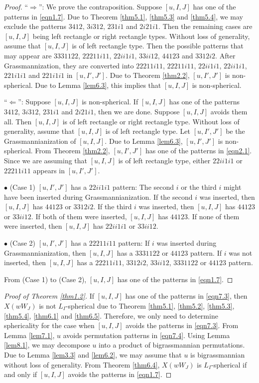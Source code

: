 \documentclass[12pt]{amsart}
\theoremstyle{definition}
\theoremstyle{remark}
\begin{document}
\begin{proof}
``$\Rightarrow$'': We prove the contraposition. Suppose $[u,I,J]$ has one of the patterns in \eqref{eqn1.7}. Due to Theorem \ref{thm5.1}, \ref{thm5.3} and \ref{thm5.4}, we may exclude the patterns $3412$, $3i312$, $231i1$ and $2i21i1$. Then the remaining cases are $[u,I,J]$ being left rectangle or right rectangle types. Without loss of generality, assume that $[u,I,J]$ is of left rectangle type. Then the possible patterns that may appear are $3331122$, $22211i11$, $22ii1i1$, $33ii12$, $44123$ and $3312i2$. After Grassmannization, they are converted into $22211i11$, $22211i11$, $22ii1i1$, $22ii1i1$, $221i1i1$ and $221i1i1$ in $[u,I',J']$. Due to Theorem \ref{thm2.2}, $[u,I',J']$ is non-spherical. Due to Lemma \ref{lem6.3}, this implies that $[u,I,J]$ is non-spherical.

``$\Leftarrow$'': Suppose $[u,I,J]$ is non-spherical. If $[u,I,J]$ has one of the patterns $3412$, $3i312$, $231i1$ and $2i21i1$, then we are done. Suppose $[u,I,J]$ avoids them all. Then $[u,I,J]$ is of left rectangle or right rectangle type. Without loss of generality, assume that $[u,I,J]$ is of left rectangle type. Let $[u,I',J']$ be the Grassmannianization of $[u,I,J]$. Due to Lemma \ref{lem6.3}, $[u,I',J']$ is non-spherical. From Theorem \ref{thm2.2}, $[u,I',J']$ has one of the patterns in \eqref{eqn2.1}. Since we are assuming that $[u,I,J]$ is of left rectangle type, either $22ii1i1$ or $22211i11$ appears in $[u,I',J']$.

$\bullet$ (Case 1) $[u,I',J']$ has a $22ii1i1$ pattern: The second $i$ or the third $i$ might have been inserted during Grassmannianization. If the second $i$ was inserted, then $[u,I,J]$ has $44123$ or $3312i2$. If the third $i$ was inserted, then $[u,I,J]$ has $44123$ or $33ii12$. If both of them were inserted, $[u,I,J]$ has $44123$. If none of them were inserted, then $[u,I,J]$ has $22ii1i1$ or $33ii12$.

$\bullet$ (Case 2) $[u,I',J']$ has a $22211i11$ pattern: If $i$ was inserted during Grassmannianization, then $[u,I,J]$ has a $3331122$ or $44123$ pattern. If $i$ was not inserted, then $[u,I,J]$ has a $22211i11$, $3312i2$, $33ii12$, $3331122$ or $44123$ pattern.

From (Case 1) to (Case 2), $[u,I,J]$ has one of the patterns in \eqref{eqn1.7}.
\end{proof}

\begin{proof}[Proof of Theorem \ref{thm1.2}]
If $[u,I,J]$ has one of the patterns in \eqref{eqn7.3}, then $X(wW_J)$ is not $L_I$-spherical due to Theorem \ref{thm5.1}, \ref{thm5.2}, \ref{thm5.3}, \ref{thm5.4}, \ref{thm6.1} and \ref{thm6.5}. Therefore, we only need to determine sphericality for the case when $[u,I,J]$ avoids the patterns in \eqref{eqn7.3}. From Lemma \ref{lem7.1}, $u$ avoids permutation patterns in \eqref{eqn7.4}. Using Lemma \ref{lem8.1}, we may decompose $u$ into a product of bigrassmannian permutations. Due to Lemma \ref{lem3.3} and \ref{lem6.2}, we may assume that $u$ is bigrassmannian without loss of generality. From Theorem \ref{thm6.4}, $X(wW_J)$ is $L_I$-spherical if and only if $[u,I,J]$ avoids the patterns in \eqref{eqn1.7}.
\end{proof}
\end{document}
